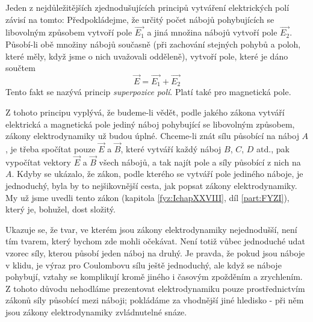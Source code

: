     Jeden z nejdůležitějších zjednodušujících principů vytváření elektrických polí závisí na tomto:
    Předpokládejme, že určitý počet nábojů pohybujících se libovolným způsobem vytvoří pole 
    \(\vec{E_1}\) a jiná množina nábojů vytvoří pole \(\vec{E_2}\). Působí-li obě množiny nábojů 
    současně (při zachování stejných pohybů a poloh, které měly, když jsme o nich uvažovali 
    odděleně), vytvoří pole, které je dáno součtem
    \begin{equation}\label{fyz:eq_fey_elmag03}
      \vec{E} = \vec{E_1} + \vec{E_2}
    \end{equation}
    Tento fakt se nazývá princip \emph{superpozice polí}. Platí také pro magnetická pole.
    
    Z tohoto principu vyplývá, že budeme-li vědět, podle jakého zákona vytváří elektrická a 
    magnetická pole jediný náboj pohybující se libovolným způsobem, zákony elektrodynamiky už budou 
    úplné. Chceme-li znát sílu působící na náboj \(A\), je třeba spočítat pouze \(\vec{E}\) a 
    \(\vec{B}\), které vytváří každý náboj \(B\), \(C\), \(D\) atd., pak vypočítat vektory 
    \(\vec{E}\) a \(\vec{B}\) všech nábojů, a tak najít  pole a síly působící z nich na \(A\). 
    Kdyby se ukázalo, že zákon, podle kterého se vytváří pole jediného náboje, je jednoduchý, byla 
    by to nejšikovnější cesta, jak popsat zákony elektrodynamiky. My už jsme uvedli tento zákon 
    (kapitola \ref{fyz:IchapXXVIII}, díl \ref{part:FYZI}), který je, bohužel, dost složitý.
    
    Ukazuje se, že tvar, ve kterém jsou zákony elektrodynamiky nejednodušší, není tím tvarem, který 
    bychom zde mohli očekávat. Není totiž vůbec jednoduché udat vzorec síly, kterou působí jeden 
    náboj na druhý. Je pravda, že pokud jsou náboje v klidu, je výraz pro Coulombovu sílu ještě 
    jednoduchý, ale když se náboje pohybují, vztahy se komplikují kromě jiného i časovým zpožděním 
    a zrychlením. Z tohoto důvodu nehodláme prezentovat elektrodynamiku pouze prostřednictvím 
    zákonů síly působící mezi náboji; pokládáme za vhodnější jiné hledisko - při něm jsou zákony 
    elektrodynamiky zvládnutelné snáze.
    
